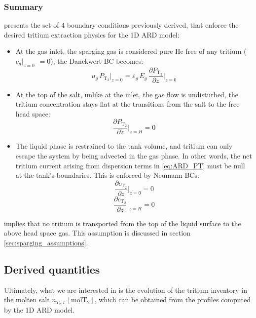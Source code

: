\documentclass[a4paper,11pt,oneside]{report}
\newcommand{\PT}{\ensuremath{P_\mathrm{T_2}}}
\newcommand{\CT}{\ensuremath{c_\mathrm{T_2}}}
\newcounter{assumption}[chapter]
\begin{document}
\subsubsection{Summary}
 presents the set of 4 boundary conditions previously derived, that enforce the desired tritium extraction physics for the 1D ARD model:
\begin{itemize}
    \item At the gas inlet, the sparging gas is considered pure He free of any tritium ($c_g\rvert_{z=0^-}=0$), the Danckwert BC becomes:
    \begin{equation}
    \label{eq:BC1}
        u_g\,\PT\rvert_{z=0} =\varepsilon_g\,E_g\,\frac{\partial \PT}{\partial z}\bigg\rvert_{z=0}
    \end{equation}
    \item At the top of the salt, unlike at the inlet, the gas flow is undisturbed, the tritium concentration stays flat at the transitions from the salt to the free head space:
    \begin{equation}
    \label{eq:BC2}
        \frac{\partial\PT}{\partial z}\bigg \rvert_{z=H}=0
    \end{equation}
    \item The liquid phase is restrained to the tank volume, and tritium can only escape the system by being advected in the gas phase. In other words, the net tritium current arising from dispersion terms in \cref{eq:ARD_PT} must be null at the tank's boundaries. This is enforced by Neumann BCs:
    \begin{equation}
    \label{eq:BC3}
        \frac{\partial\CT}{\partial z}\bigg \rvert_{z=0}=0
    \end{equation}
    \begin{equation}
    \label{eq:BC4}
        \frac{\partial\CT}{\partial z}\bigg \rvert_{z=H}=0
    \end{equation}
\end{itemize}

 implies that no tritium is transported from the top of the liquid surface to the above head space gas. This assumption is discussed in section \ref{sec:sparging_assumptions}.

\subsection{Derived quantities}
Ultimately, what we are interested in is the evolution of the tritium inventory in the molten salt $n_{T_2,l} \:\mathrm{[molT_2]}$, which can be obtained from the profiles computed by the 1D ARD model. 
\end{document}
